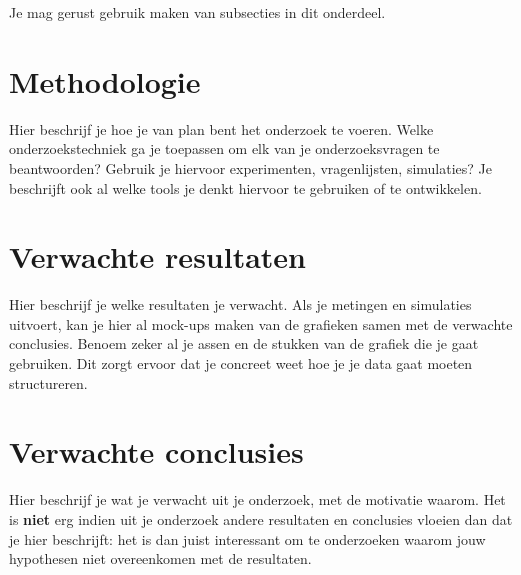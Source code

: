 Je mag gerust gebruik maken van subsecties in dit onderdeel.

\section{Methodologie}
\label{sec:methodologie}

Hier beschrijf je hoe je van plan bent het onderzoek te voeren. Welke onderzoekstechniek ga je toepassen om elk van je onderzoeksvragen te beantwoorden? Gebruik je hiervoor experimenten, vragenlijsten, simulaties? Je beschrijft ook al welke tools je denkt hiervoor te gebruiken of te ontwikkelen.

\section{Verwachte resultaten}
\label{sec:verwachte_resultaten}

Hier beschrijf je welke resultaten je verwacht. Als je metingen en simulaties uitvoert, kan je hier al mock-ups maken van de grafieken samen met de verwachte conclusies. Benoem zeker al je assen en de stukken van de grafiek die je gaat gebruiken. Dit zorgt ervoor dat je concreet weet hoe je je data gaat moeten structureren.

\section{Verwachte conclusies}
\label{sec:verwachte_conclusies}

Hier beschrijf je wat je verwacht uit je onderzoek, met de motivatie waarom. Het is \textbf{niet} erg indien uit je onderzoek andere resultaten en conclusies vloeien dan dat je hier beschrijft: het is dan juist interessant om te onderzoeken waarom jouw hypothesen niet overeenkomen met de resultaten.

